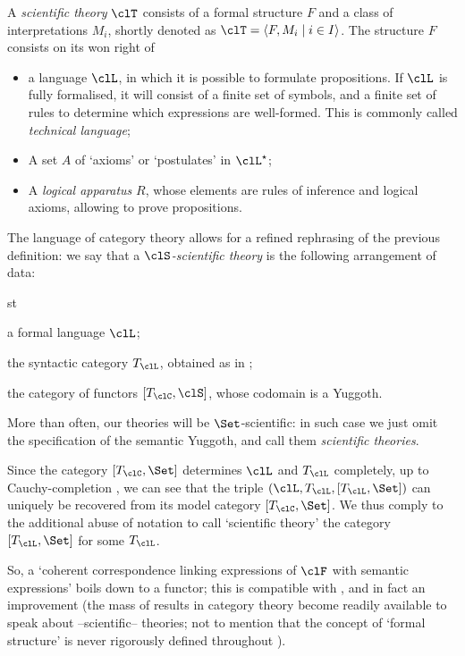 \begin{definition*}
	A \emph{scientific theory} $\clT$ consists of a formal structure $F$ and a class of interpretations $M_i$, shortly denoted as $\clT=\langle F,M_i\mid i\in I\rangle$. The structure $F$ consists on its won right of
	\begin{itemize}
		\item a language $\clL$, in which it is possible to formulate propositions. If $\clL$ is fully formalised, it will consist of a finite set of symbols, and a finite set of rules to determine which expressions are well-formed. This is commonly called \emph{technical language};
		\item A set $A$ of `axioms' or `postulates' in $\clL^\star$;
		\item A \emph{logical apparatus} $R$, whose elements are rules of inference and logical axioms, allowing to prove propositions.
	\end{itemize}
\end{definition*}
The language of category theory allows for a refined rephrasing of the previous definition: we say that a \emph{$\clS$-scientific theory} is the following arrangement of data:
\begin{enumtag}{st}
	\item a formal language $\clL$;
	\item the syntactic category $T_\clL$, obtained as in \cite[II.11]{lambek1988introduction};
	\item the category of functors $[T_\clC, \clS]$, whose codomain is a Yuggoth.
\end{enumtag}
More than often, our theories will be $\Set$-scientific: in such case we just omit the specification of the semantic Yuggoth, and call them \emph{scientific theories}.

Since the category $[T_\clC, \Set]$ determines $\clL$ and $T_\clL$ completely, up to Cauchy-completion \cite{borceuso-cauchy}, we can see that the triple $(\clL, T_\clL, [T_\clL,\Set])$ can uniquely be recovered from its model category $[T_\clC, \Set]$. We thus comply to the additional abuse of notation to call `scientific theory' the category $[T_\clL,\Set]$ for some $T_\clL$.

So, a `coherent correspondence linking expressions of $\clF$ with semantic expressions' boils down to a functor; this is compatible with \cite[2.1]{biologia}, and in fact an improvement (the mass of results in category theory become readily available to speak about --scientific-- theories; not to mention that the concept of `formal structure' is never rigorously defined throughout \cite{biologia}).

